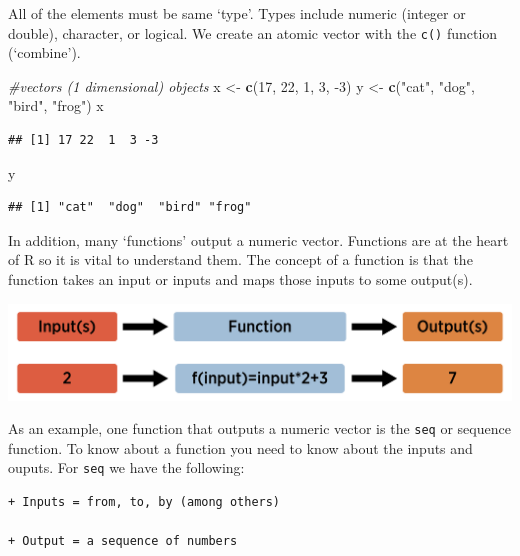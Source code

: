 \documentclass[
]{book}
\newenvironment{Shaded}{\begin{snugshade}}{\end{snugshade}}
\newcommand{\CommentTok}[1]{\textcolor[rgb]{0.56,0.35,0.01}{\textit{#1}}}
\newcommand{\DecValTok}[1]{\textcolor[rgb]{0.00,0.00,0.81}{#1}}
\newcommand{\KeywordTok}[1]{\textcolor[rgb]{0.13,0.29,0.53}{\textbf{#1}}}
\newcommand{\NormalTok}[1]{#1}
\newcommand{\StringTok}[1]{\textcolor[rgb]{0.31,0.60,0.02}{#1}}
\theoremstyle{definition}
\theoremstyle{definition}
\theoremstyle{definition}
\theoremstyle{remark}
\begin{document}
All of the elements must be same `type'. Types include numeric (integer or double), character, or logical. We create an atomic vector with the \texttt{c()} function (`combine').

\begin{Shaded}
\begin{Highlighting}[]
\CommentTok{#vectors (1 dimensional) objects}
\NormalTok{x <-}\StringTok{ }\KeywordTok{c}\NormalTok{(}\DecValTok{17}\NormalTok{, }\DecValTok{22}\NormalTok{, }\DecValTok{1}\NormalTok{, }\DecValTok{3}\NormalTok{, }\DecValTok{-3}\NormalTok{)}
\NormalTok{y <-}\StringTok{ }\KeywordTok{c}\NormalTok{(}\StringTok{"cat"}\NormalTok{, }\StringTok{"dog"}\NormalTok{, }\StringTok{"bird"}\NormalTok{, }\StringTok{"frog"}\NormalTok{)}
\NormalTok{x}
\end{Highlighting}
\end{Shaded}

\begin{verbatim}
## [1] 17 22  1  3 -3
\end{verbatim}

\begin{Shaded}
\begin{Highlighting}[]
\NormalTok{y}
\end{Highlighting}
\end{Shaded}

\begin{verbatim}
## [1] "cat"  "dog"  "bird" "frog"
\end{verbatim}

In addition, many `functions' output a numeric vector. Functions are at the heart of R so it is vital to understand them. The concept of a function is that the function takes an input or inputs and maps those inputs to some output(s).

\begin{center}\includegraphics[width=0.8\linewidth]{img/funVisual1F} \end{center}

As an example, one function that outputs a numeric vector is the \texttt{seq} or sequence function. To know about a function you need to know about the inputs and ouputs. For \texttt{seq} we have the following:

\begin{verbatim}
+ Inputs = from, to, by (among others)  

+ Output = a sequence of numbers
\end{verbatim}
\end{document}
